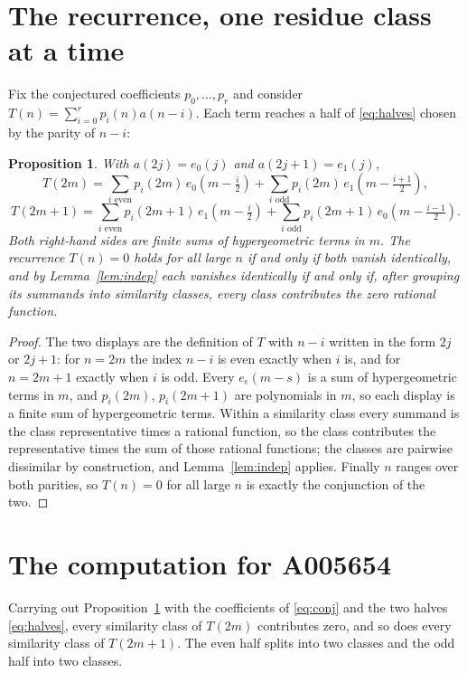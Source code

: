 \documentclass[11pt,a4paper]{article}
\theoremstyle{plain}
\newtheorem{proposition}[theorem]{Proposition}
\theoremstyle{definition}
\begin{document}
\section{The recurrence, one residue class at a time}

Fix the conjectured coefficients $p_{0},\dots,p_{r}$ and consider
$T(n)=\sum_{i=0}^{r}p_{i}(n)a(n-i)$. Each term reaches a half of \eqref{eq:halves} chosen
by the parity of $n-i$:

\begin{proposition}\label{prop:split}
With $a(2j)=e_{0}(j)$ and $a(2j+1)=e_{1}(j)$,
\[
T(2m)=\sum_{i \text{ even}}p_{i}(2m)\,e_{0}\!\left(m-\tfrac{i}{2}\right)
      +\sum_{i \text{ odd}}p_{i}(2m)\,e_{1}\!\left(m-\tfrac{i+1}{2}\right),
\]
\[
T(2m+1)=\sum_{i \text{ even}}p_{i}(2m+1)\,e_{1}\!\left(m-\tfrac{i}{2}\right)
      +\sum_{i \text{ odd}}p_{i}(2m+1)\,e_{0}\!\left(m-\tfrac{i-1}{2}\right).
\]
Both right-hand sides are finite sums of hypergeometric terms in $m$. The recurrence
$T(n)=0$ holds for all large $n$ if and only if both vanish identically, and by
Lemma~\ref{lem:indep} each vanishes identically if and only if, after grouping its
summands into similarity classes, every class contributes the zero rational function.
\end{proposition}

\begin{proof}
The two displays are the definition of $T$ with $n-i$ written in the form $2j$ or $2j+1$:
for $n=2m$ the index $n-i$ is even exactly when $i$ is, and for $n=2m+1$ exactly when $i$
is odd. Every $e_{\epsilon}(m-s)$ is a sum of hypergeometric terms in $m$, and
$p_{i}(2m)$, $p_{i}(2m+1)$ are polynomials in $m$, so each display is a finite sum of
hypergeometric terms. Within a similarity class every summand is the class representative
times a rational function, so the class contributes the representative times the sum of
those rational functions; the classes are pairwise dissimilar by construction, and
Lemma~\ref{lem:indep} applies. Finally $n$ ranges over both parities, so $T(n)=0$ for all
large $n$ is exactly the conjunction of the two.
\end{proof}

\section{The computation for A005654}

Carrying out Proposition~\ref{prop:split} with the coefficients of \eqref{eq:conj} and the
two halves \eqref{eq:halves}, every similarity class of $T(2m)$ contributes zero, and so
does every similarity class of $T(2m+1)$. The even half splits into two classes
and the odd half into two classes.
\end{document}
